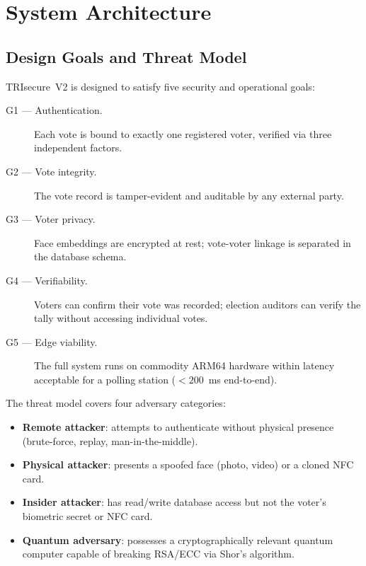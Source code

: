 \documentclass[pdflatex,sn-mathphys-num]{sn-jnl}%
\theoremstyle{thmstyleone}%
\theoremstyle{thmstyletwo}%
\theoremstyle{thmstylethree}%
\begin{document}
\section{System Architecture}\label{sec:architecture}

\subsection{Design Goals and Threat Model}

TRIsecure~V2 is designed to satisfy five security and operational goals:

\begin{description}
  \item[G1 --- Authentication.] Each vote is bound to exactly one registered
    voter, verified via three independent factors.
  \item[G2 --- Vote integrity.] The vote record is tamper-evident and auditable
    by any external party.
  \item[G3 --- Voter privacy.] Face embeddings are encrypted at rest;
    vote-voter linkage is separated in the database schema.
  \item[G4 --- Verifiability.] Voters can confirm their vote was recorded;
    election auditors can verify the tally without accessing individual votes.
  \item[G5 --- Edge viability.] The full system runs on commodity ARM64
    hardware within latency acceptable for a polling station ($<200$~ms
    end-to-end).
\end{description}

The threat model covers four adversary categories:

\begin{itemize}
  \item \textbf{Remote attacker}: attempts to authenticate without physical
    presence (brute-force, replay, man-in-the-middle).
  \item \textbf{Physical attacker}: presents a spoofed face (photo, video) or
    a cloned NFC card.
  \item \textbf{Insider attacker}: has read/write database access but not the
    voter's biometric secret or NFC card.
  \item \textbf{Quantum adversary}: possesses a cryptographically relevant
    quantum computer capable of breaking RSA/ECC via Shor's algorithm.
\end{itemize}
\end{document}
